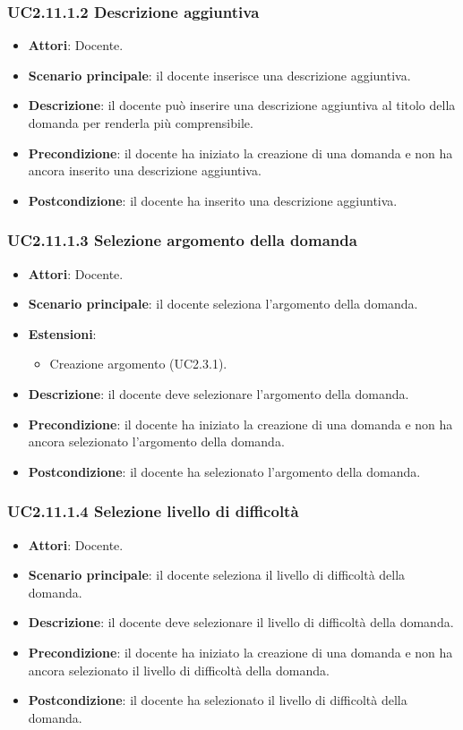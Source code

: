 \subsubsection{UC2.11.1.2 Descrizione aggiuntiva}
\begin{itemize}
\item \textbf{Attori}: Docente.
\item \textbf{Scenario principale}: il docente inserisce una descrizione aggiuntiva.
\item \textbf{Descrizione}: il docente può inserire una descrizione aggiuntiva al titolo della domanda per renderla più comprensibile.
\item \textbf{Precondizione}: il docente ha iniziato la creazione di una domanda e non ha ancora inserito una descrizione aggiuntiva.
\item \textbf{Postcondizione}: il docente ha inserito una descrizione aggiuntiva.
\end{itemize}
\subsubsection{UC2.11.1.3 Selezione argomento della domanda}
\begin{itemize}
\item \textbf{Attori}: Docente.
\item \textbf{Scenario principale}: il docente seleziona l'argomento della domanda.
\item \textbf{Estensioni}:
\begin{itemize}
\item Creazione argomento (UC2.3.1).
\end{itemize}
\item \textbf{Descrizione}: il docente deve selezionare l'argomento della domanda.
\item \textbf{Precondizione}: il docente ha iniziato la creazione di una domanda e non ha ancora selezionato l'argomento della domanda.
\item \textbf{Postcondizione}: il docente ha selezionato l'argomento della domanda.
\end{itemize}
\subsubsection{UC2.11.1.4 Selezione livello di difficoltà}
\begin{itemize}
\item \textbf{Attori}: Docente.
\item \textbf{Scenario principale}: il docente seleziona il livello di difficoltà della domanda.
\item \textbf{Descrizione}: il docente deve selezionare il livello di difficoltà della domanda.
\item \textbf{Precondizione}: il docente ha iniziato la creazione di una domanda e non ha ancora selezionato il livello di difficoltà della domanda.
\item \textbf{Postcondizione}: il docente ha selezionato il livello di difficoltà della domanda.
\end{itemize}
